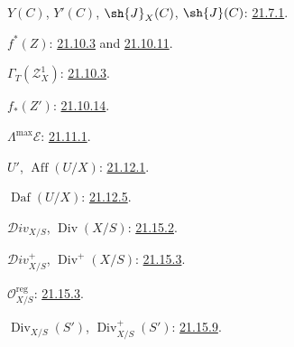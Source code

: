 $Y(C)$, $Y'(C)$, $\sh{J}_X(C)$, $\sh{J}(C)$:
{\hyperlink{ega4.c04.statement.21-7-1}{21.7.1}}.

$f^*(Z)$: {\hyperlink{ega4.c04.statement.21-10-3}{21.10.3}} and {\hyperlink{ega4.c04.statement.21-10-11}{21.10.11}}.

$\Gamma_T(\mathscr Z_X^1)$: {\hyperlink{ega4.c04.statement.21-10-3}{21.10.3}}.

$f_*(Z')$: {\hyperlink{ega4.c04.statement.21-10-14}{21.10.14}}.

$\Lambda^{\max}\mathcal E$: {\hyperlink{ega4.c04.thm.21-11-1}{21.11.1}}.

$U'$, $\operatorname{Aff}(U/X)$: {\hyperlink{ega4.c04.statement.21-12-1}{21.12.1}}.

$\operatorname{Daf}(U/X)$: {\hyperlink{ega4.c04.statement.21-12-5}{21.12.5}}.

$\mathcal{D}iv_{X/S}$, $\operatorname{Div}(X/S)$:
{\hyperlink{ega4.c04.def.21-15-2}{21.15.2}}.

$\mathcal{D}iv_{X/S}^+$, $\operatorname{Div}^+(X/S)$:
{\hyperlink{ega4.c04.statement.21-15-3}{21.15.3}}.

$\mathcal O_{X/S}^{\mathrm{reg}}$: {\hyperlink{ega4.c04.statement.21-15-3}{21.15.3}}.

$\operatorname{Div}_{X/S}(S')$, $\operatorname{Div}_{X/S}^+(S')$:
{\hyperlink{ega4.c04.statement.21-15-9}{21.15.9}}.

\endgroup
